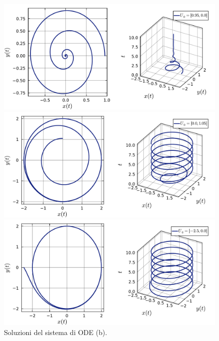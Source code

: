 \documentclass[letterpaper, 12pt]{article}
\numberwithin{equation}{section}    %
\begin{document}
\begin{figure}[!ht]
    \centering
    \begin{minipage}[b]{0.47\textwidth}
        \includegraphics[width=\textwidth]{632B1.pdf}
    \end{minipage}
    \hspace{0.5cm}
    \begin{minipage}[b]{0.47\textwidth}
        \includegraphics[width=\textwidth]{632B2.pdf}
    \end{minipage}
    \begin{minipage}[b]{0.47\textwidth}
        \includegraphics[width=\textwidth]{632B3.pdf}
    \end{minipage}
    \caption{Soluzioni del sistema di ODE (b).}
    \label{fig:es6_3_2_2}
\end{figure}
\end{document}
